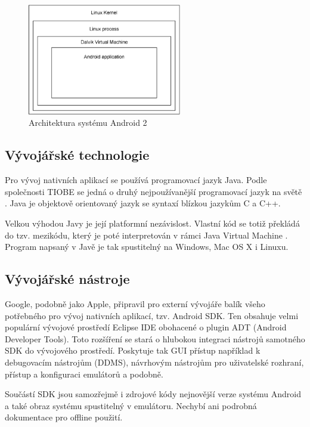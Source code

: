 \begin{figure}\centering
\includegraphics[width=0.6\textwidth]{android_app_tech.png}
\caption{Architektura systému Android 2 \cite{introduction_android_development}}
\label{fig:AndroidArchitecture2}
\end{figure}

\subsection{Vývojářské technologie}
Pro vývoj nativních aplikací se používá programovací jazyk Java. Podle společnosti TIOBE se jedná o druhý nejpoužívanější programovací jazyk na světě \cite{tiobe_software}. Java je objektově orientovaný jazyk se syntaxí blízkou jazykům C a C++.

Velkou výhodou Javy je její platformní nezávislost. Vlastní kód se totiž překládá do tzv. mezikódu, který je poté interpretován v rámci Java Virtual Machine \cite{understanding_jvm_internals}. Program napsaný v Javě je tak spustitelný na Windows, Mac OS X i Linuxu.

\subsection{Vývojářské nástroje}
Google, podobně jako Apple, připravil pro externí vývojáře balík všeho potřebného pro vývoj nativních aplikací, tzv. Android SDK. Ten obsahuje velmi populární vývojové prostředí Eclipse IDE obohacené o plugin ADT (Android Developer Tools). Toto rozšíření se stará o hlubokou integraci nástrojů samotného SDK do vývojového prostředí. Poskytuje tak GUI přístup například k debugovacím nástrojům (DDMS), návrhovým nástrojům pro uživatelské rozhraní, přístup a konfiguraci emulátorů a podobně.

Součástí SDK jsou samozřejmě i zdrojové kódy nejnovější verze systému Android a také obraz systému spustitelný v emulátoru. Nechybí ani podrobná dokumentace pro offline použití.

